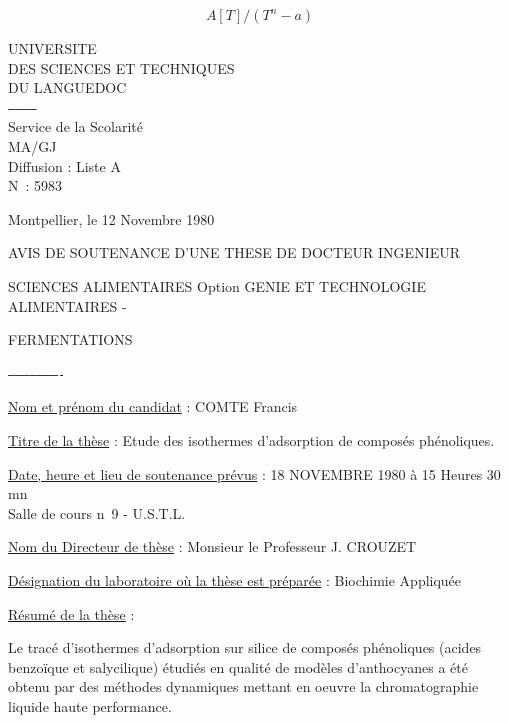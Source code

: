 
\[
A[T]/(T^n-a)
\]


UNIVERSITE\\
DES SCIENCES ET TECHNIQUES\\
DU LANGUEDOC\\
\texttt{------------}\\
Service de la Scolarité\\
MA/GJ\\
Diffusion : Liste A\\
N\textdegree\ : 5983

Montpellier, le 12 Novembre 1980

AVIS DE SOUTENANCE D'UNE THESE DE DOCTEUR INGENIEUR

SCIENCES ALIMENTAIRES Option GENIE ET TECHNOLOGIE ALIMENTAIRES -

FERMENTATIONS

\texttt{----------------------}

\uline{Nom et prénom du candidat} : COMTE Francis

\uline{Titre de la thèse} : Etude des isothermes d'adsorption de composés phénoliques.

\uline{Date, heure et lieu de soutenance prévus} : 18 NOVEMBRE 1980 à 15 Heures 30 mn\\
Salle de cours n\textdegree\ 9 - U.S.T.L.

\uline{Nom du Directeur de thèse} : Monsieur le Professeur J. CROUZET

\uline{Désignation du laboratoire où la thèse est préparée} : Biochimie Appliquée

\uline{Résumé de la thèse} :

Le tracé d'isothermes d'adsorption sur silice de composés phénoliques (acides benzoïque et salycilique) étudiés en qualité de modèles d'anthocyanes a été obtenu par des méthodes dynamiques mettant en oeuvre la chromatographie liquide haute performance.

